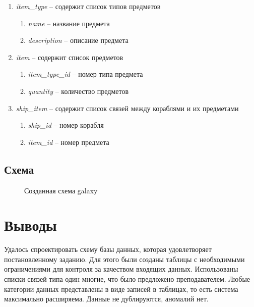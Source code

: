 \begin{enumerate}
\item {\it item\_type} -- содержит список типов предметов
\begin{enumerate}
\item {\it name} -- название предмета
\item {\it description} -- описание предмета
\end{enumerate}

\item {\it item} -- содержит список предметов
\begin{enumerate}
\item {\it item\_type\_id} -- номер типа предмета
\item {\it quantity} -- количество предметов
\end{enumerate}

\item {\it ship\_item} -- содержит список связей между кораблями и их предметами
\begin{enumerate}
\item {\it ship\_id} -- номер корабля
\item {\it item\_id} -- номер предмета
\end{enumerate}

\end{enumerate}

\subsection{Схема}

\begin{figure}[H]
	\begin{center}
		\caption{Созданная схема galaxy} 
		\label{pic:scheme_galaxy} %
	\end{center}
\end{figure}

\section{Выводы}
Удалось спроектировать схему базы данных, которая удовлетворяет постановленному заданию. Для этого были созданы таблицы с необходимыми ограничениями для контроля за качеством входящих данных. Использованы списки связей типа один-многие, что было предложено преподавателем. Любые категории данных представлены в виде записей в таблицах, то есть система максимально расширяема. Данные не дублируются, аномалий нет.

